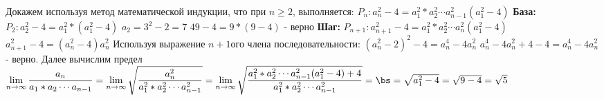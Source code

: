 \documentclass[11pt]{article}
\begin{document}
	Докажем используя  метод математической индукции, что при $n \geq 2$, выполняется: \sspace
	$P_n : a_n^2 - 4 = a_1^2*a_2^2\cdots a_{n - 1}^2 (a_1^2 - 4)$\bs
	\textbf{База:} $P_2: a_2^2 - 4 = a_1^2*(a_1^2 - 4)$ \sspace
	$a_2 = 3^2 - 2 = 7$ \sspace
	$49 - 4 = 9 * (9 - 4)$ - верно \bs
	\textbf{Шаг:} $P_{n + 1}: a_{n + 1}^2 - 4 = a_1^2 * a_2^2 \cdots a_{n}^2(a_1^2 - 4)$ \bs
	$a_{n + 1}^2 - 4 = (a_n^2 - 4)a_n^2$
	\sspace Используя выражение $n + 1$ого члена последовательности: \sspace 
	$(a_n^2 - 2)^2 - 4 = a_n^4 - 4a_n^2$ \space
	$a_n^4 - 4a_n^2 + 4 - 4 = a_n^4 - 4a_n^2$ - верно. \bs
	Далее вычислим предел \bs
	$\lim\limits_{n\to \infty} \dfrac{a_n}{a_1*a_2\cdots a_{n - 1}} = {\lim\limits_{n\to \infty} \sqrt{\dfrac{a_n^2}{a_1^2*a_2^2\cdots a_{n - 1}^2}}} = {\lim\limits_{n\to \infty} \sqrt{\dfrac{ a_1^2*a_2^2\cdots a_{n - 1}^2 (a_1^2 - 4) + 4}{a_1^2*a_2^2\cdots a_{n - 1}^2}}} = \bs = \sqrt{a_1^2 - 4} = \sqrt{9 - 4} = \sqrt{5}$ \bs
\end{document}
